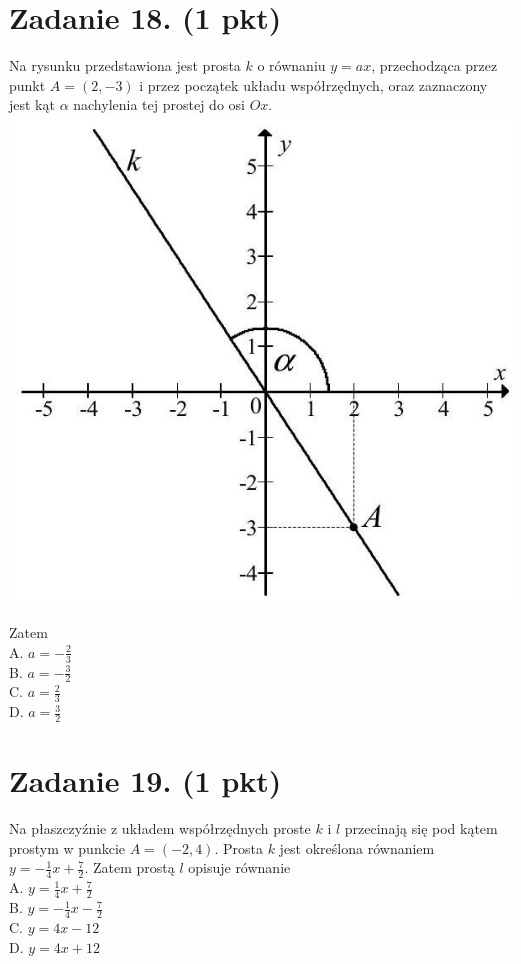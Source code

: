 \documentclass[10pt]{article}
\begin{document}
\section*{Zadanie 18. (1 pkt)}
Na rysunku przedstawiona jest prosta \(k\) o równaniu \(y=a x\), przechodząca przez punkt \(A=(2,-3)\) i przez początek układu współrzędnych, oraz zaznaczony jest kąt \(\alpha\) nachylenia tej prostej do osi \(O x\).\\
\includegraphics[max width=\textwidth, center]{2024_11_21_ad8c43efe74fa059d24eg-12}

Zatem\\
A. \(a=-\frac{2}{3}\)\\
B. \(a=-\frac{3}{2}\)\\
C. \(a=\frac{2}{3}\)\\
D. \(a=\frac{3}{2}\)

\section*{Zadanie 19. (1 pkt)}
Na płaszczyźnie z układem współrzędnych proste \(k\) i \(l\) przecinają się pod kątem prostym w punkcie \(A=(-2,4)\). Prosta \(k\) jest określona równaniem \(y=-\frac{1}{4} x+\frac{7}{2}\). Zatem prostą \(l\) opisuje równanie\\
A. \(y=\frac{1}{4} x+\frac{7}{2}\)\\
B. \(y=-\frac{1}{4} x-\frac{7}{2}\)\\
C. \(y=4 x-12\)\\
D. \(y=4 x+12\)
\end{document}
